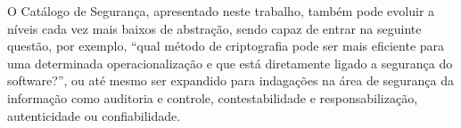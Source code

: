 O Catálogo de Segurança, apresentado neste trabalho, também pode evoluir a níveis cada vez mais baixos de abstração, sendo capaz de entrar na seguinte questão, por exemplo, “qual método de criptografia pode ser mais eficiente para uma determinada operacionalização e que está diretamente ligado a segurança do software?”, ou até mesmo ser expandido para indagações na área de segurança da informação como auditoria e controle, contestabilidade e responsabilização, autenticidade ou confiabilidade.  


\begin{comment}
	Prática essa que pode levar a muitos insucessos, tais como o Caso da Ambulância de Londres \cite{finkelstein1996comedy}.
	
	“”
\end{comment}
 


